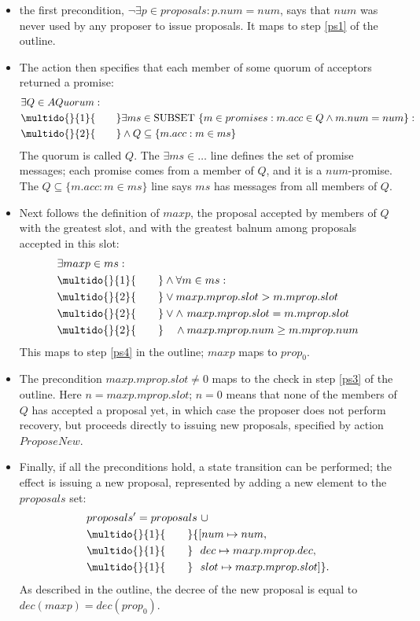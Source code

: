 \documentclass[12pt,a4paper,en]{pracamgr}
\newcommand{\ind}[1]{\multido{}{#1}{\qquad}}
\begin{document}
\begin{itemize}
    \item the first precondition, $\lnot \exists p \in proposals: p.num = num$, says that $num$ was never used by any proposer to issue proposals. It maps to step \ref{ps1} of the outline.
    \item The action then specifies that each member of some quorum of acceptors returned a promise:
        \begin{align*}
            & \exists Q \in AQuorum:\\
            & \ind{1} \exists ms \in \text{SUBSET}\ \{m \in promises: m.acc \in Q \land m.num = num\}:\\
            & \ind{2} \land Q \subseteq \{m.acc: m \in ms\}
        \end{align*}
        The quorum is called $Q$. The $\exists ms \in \dots$ line defines the set of promise messages; each promise comes from a member of $Q$, and it is a $num$-promise. The $Q \subseteq \{m.acc: m \in ms\}$ line says $ms$ has messages from all members of $Q$.
    \item Next follows the definition of $maxp$, the proposal accepted by members of $Q$ with the greatest slot, and with the greatest balnum among proposals accepted in this slot:
        \begin{align*}
            & \exists maxp \in ms:\\
            & \ind{1} \land \forall m \in ms:\\
            & \ind{2} \lor maxp.mprop.slot > m.mprop.slot\\
            & \ind{2} \lor  \land\ maxp.mprop.slot = m.mprop.slot\\
            & \ind{2} \quad \land maxp.mprop.num \ge m.mprop.num
        \end{align*}
        This maps to step \ref{ps4} in the outline; $maxp$ maps to $prop_0$.
    \item The precondition $maxp.mprop.slot \neq 0$ maps to the check in step \ref{ps3} of the outline. Here $n = maxp.mprop.slot$; $n = 0$ means that none of the members of $Q$ has accepted a proposal yet, in which case the proposer does not perform recovery, but proceeds directly to issuing new proposals, specified by action $ProposeNew$.
    \item Finally, if all the preconditions hold, a state transition can be performed; the effect is issuing a new proposal, represented by adding a new element to the $proposals$ set:
        \begin{align*}
            & proposals' = proposals\ \cup\\
            & \ind{1} \{[num \mapsto num,\\
            & \ind{1} \ \ dec \mapsto maxp.mprop.dec,\\
            & \ind{1} \ \ slot \mapsto maxp.mprop.slot]\}.
        \end{align*}
        As described in the outline, the decree of the new proposal is equal to $dec(maxp) = dec(prop_0)$.
\end{itemize}
\end{document}
